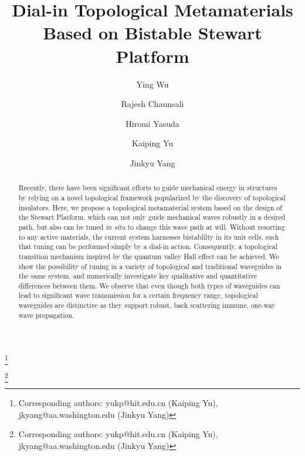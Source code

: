 \documentclass[aps,preprint,onecolumn,showpacs,superscriptaddress,groupedaddress]{revtex4}  %
\begin{document}
\title{Dial-in Topological Metamaterials \\ Based on Bistable Stewart Platform}%

\author{Ying Wu}
\author{Rajesh Chaunsali}
\author{Hiromi Yasuda}
\author{Kaiping Yu}
\thanks{Corresponding authors: yukp@hit.edu.cn (Kaiping Yu), jkyang@aa.washington.edu (Jinkyu Yang)}
\author{Jinkyu Yang}
\thanks{Corresponding authors: yukp@hit.edu.cn (Kaiping Yu), jkyang@aa.washington.edu (Jinkyu Yang)}


\begin{abstract}
Recently, there have been significant efforts to guide mechanical energy in structures by relying on a novel topological framework popularized by the discovery of topological insulators. Here, we propose a topological metamaterial system based on the design of the Stewart Platform, which can not only guide mechanical waves robustly in a desired path, but also can be tuned \textit{in situ} to change this wave path at will. Without resorting to any active materials, the current system harnesses bistablilty in its unit cells, such that tuning can be performed simply by a dial-in action. Consequently, a topological transition mechanism inspired by the quantum valley Hall effect can be achieved. We show the possibility of tuning in a variety of topological and traditional waveguides in the same system, and numerically investigate key qualitative and quantitative differences between them. We observe that even though both types of waveguides can lead to significant wave transmission for a certain frequency range, topological waveguides are distinctive as they support robust, back scattering immune, one-way wave propagation.  
\end{abstract}
\end{document}
